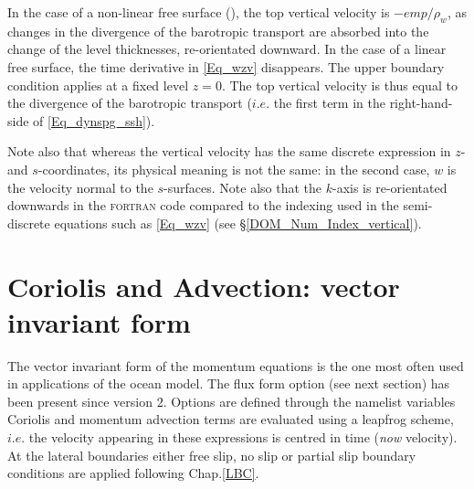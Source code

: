 In the case of a non-linear free surface (), the top vertical velocity is $-\textit{emp}/\rho_w$, 
as changes in the divergence of the barotropic transport are absorbed into the change 
of the level thicknesses, re-orientated downward.
In the case of a linear free surface, the time derivative in \eqref{Eq_wzv} disappears.
The upper boundary condition applies at a fixed level $z=0$. The top vertical velocity 
is thus equal to the divergence of the barotropic transport ($i.e.$ the first term in the
right-hand-side of \eqref{Eq_dynspg_ssh}).

Note also that whereas the vertical velocity has the same discrete 
expression in $z$- and $s$-coordinates, its physical meaning is not the same: 
in the second case, $w$ is the velocity normal to the $s$-surfaces. 
Note also that the $k$-axis is re-orientated downwards in the \textsc{fortran} code compared 
to the indexing used in the semi-discrete equations such as \eqref{Eq_wzv} 
(see  \S\ref{DOM_Num_Index_vertical}). 


\section{Coriolis and Advection: vector invariant form}
\label{DYN_adv_cor_vect}

The vector invariant form of the momentum equations is the one most 
often used in applications of the \NEMO ocean model. The flux form option 
(see next section) has been present since version $2$. Options are defined
through the  namelist variables
Coriolis and momentum advection terms are evaluated using a leapfrog 
scheme, $i.e.$ the velocity appearing in these expressions is centred in 
time (\textit{now} velocity). 
At the lateral boundaries either free slip, no slip or partial slip boundary 
conditions are applied following Chap.\ref{LBC}.

